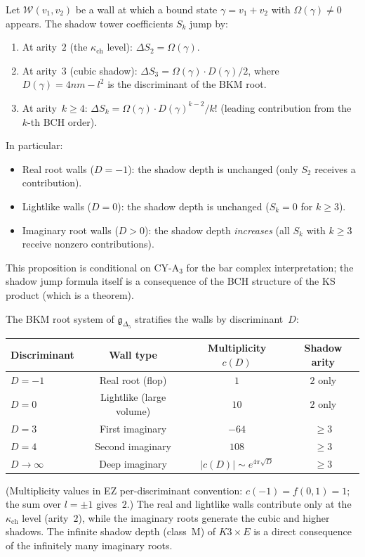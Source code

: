 \begin{proposition}
\label{prop:k3e-shadow-jump}
Let $\mathcal{W}(v_1, v_2)$ be a wall at which a bound state $\gamma = v_1 + v_2$ with $\Omega(\gamma) \neq 0$ appears. The shadow tower coefficients $S_k$ jump by:
\begin{enumerate}[label=(\roman*)]
 \item At arity~$2$ (the $\kappa_{\mathrm{ch}}$ level): $\Delta S_2 = \Omega(\gamma)$.
 \item At arity~$3$ (cubic shadow): $\Delta S_3 = \Omega(\gamma) \cdot D(\gamma)/2$, where $D(\gamma) = 4nm - l^2$ is the discriminant of the BKM root.
 \item At arity~$k \geq 4$: $\Delta S_k = \Omega(\gamma) \cdot D(\gamma)^{k-2}/k!$ (leading contribution from the $k$-th BCH order).
\end{enumerate}
In particular:
\begin{itemize}
 \item Real root walls ($D = -1$): the shadow depth is unchanged (only $S_2$ receives a contribution).
 \item Lightlike walls ($D = 0$): the shadow depth is unchanged ($S_k = 0$ for $k \geq 3$).
 \item Imaginary root walls ($D > 0$): the shadow depth \emph{increases} (all $S_k$ with $k \geq 3$ receive nonzero contributions).
\end{itemize}
This proposition is conditional on CY-A$_3$ for the bar complex interpretation; the shadow jump formula itself is a consequence of the BCH structure of the KS product (which is a theorem).
\end{proposition}

\begin{remark}
\label{rem:k3e-disc-strat}
The BKM root system of $\mathfrak{g}_{\Delta_5}$ stratifies the walls by discriminant~$D$:
\begin{center}
\renewcommand{\arraystretch}{1.2}
\begin{tabular}{@{}lccc@{}}
\textbf{Discriminant} & \textbf{Wall type} & \textbf{Multiplicity $c(D)$} & \textbf{Shadow arity} \\ \hline
$D = -1$ & Real root (flop) & $1$ & $2$ only \\
$D = 0$ & Lightlike (large volume) & $10$ & $2$ only \\
$D = 3$ & First imaginary & $-64$ & $\geq 3$ \\
$D = 4$ & Second imaginary & $108$ & $\geq 3$ \\
$D \to \infty$ & Deep imaginary & $|c(D)| \sim e^{4\pi\sqrt{D}}$ & $\geq 3$
\end{tabular}
\end{center}
(Multiplicity values in EZ per-discriminant convention: $c(-1) = f(0,1) = 1$; the sum over $l = \pm 1$ gives~$2$.)
The real and lightlike walls contribute only at the $\kappa_{\mathrm{ch}}$ level (arity~$2$), while the imaginary roots generate the cubic and higher shadows. The infinite shadow depth (class~M) of $K3 \times E$ is a direct consequence of the infinitely many imaginary roots.
\end{remark}

